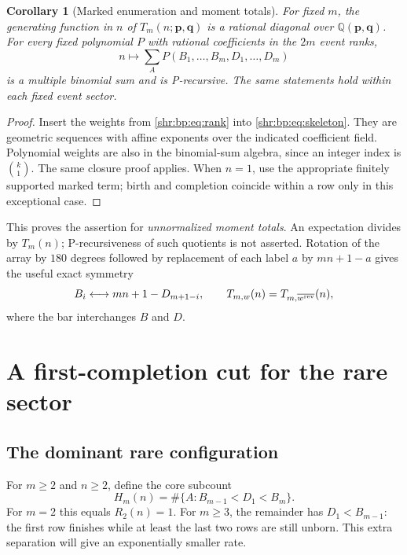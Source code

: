 \documentclass[11pt,letterpaper]{article}
\numberwithin{equation}{section}
\newtheorem{corollary}[theorem]{Corollary}
\theoremstyle{definition}
\newcommand{\Q}{\mathbb Q}
\newcommand{\1}{\mathbf 1}
\begin{document}
\begin{corollary}[Marked enumeration and moment totals]
\label{shr:bp:cor:marks}
For fixed $m$, the generating function in $n$ of
$T_m(n;\mathbf p,\mathbf q)$ is a rational diagonal over
$\Q(\mathbf p,\mathbf q)$. For every fixed polynomial $P$ with rational coefficients in the
$2m$ event ranks,
\[
 n\longmapsto\sum_A P(B_1,\ldots,B_m,D_1,\ldots,D_m)
\]
is a multiple binomial sum and is P-recursive. The same statements hold
within each fixed event sector.
\end{corollary}
\begin{proof}
Insert the weights from \eqref{shr:bp:eq:rank} into \eqref{shr:bp:eq:skeleton}.
They are geometric sequences with affine exponents over the indicated
coefficient field. Polynomial weights are also in the binomial-sum
algebra, since an integer index is $\binom{k}{1}$. The same closure proof
applies. When $n=1$, use the appropriate finitely supported marked term;
birth and completion coincide within a row only in this exceptional case.
\end{proof}

This proves the assertion for \emph{unnormalized moment totals}.
An expectation divides by $T_m(n)$; P-recursiveness of such quotients is
not asserted.
Rotation of the array by $180$ degrees followed by replacement of each
label $a$ by $mn+1-a$ gives the useful exact symmetry
\begin{equation}
 B_i\longleftrightarrow mn+1-D_{m+1-i},\qquad
 T_{m,w}(n)=T_{m,\overline{w^{\rm rev}}}(n),
 \label{shr:bp:eq:dual}
\end{equation}
where the bar interchanges $B$ and $D$.

\section{A first-completion cut for the rare sector}
\label{shr:bp:sec:cut}

\subsection{The dominant rare configuration}
For $m\ge2$ and $n\ge2$, define the core subcount
\begin{equation}
 H_m(n)=\#\{A:B_{m-1}<D_1<B_m\}.
 \label{shr:bp:eq:coredef}
\end{equation}
For $m=2$ this equals $R_2(n)=1$. For $m\ge3$, the remainder has
$D_1<B_{m-1}$: the first row finishes while at least the last two rows
are still unborn. This extra separation will give an exponentially
smaller rate.
\end{document}
